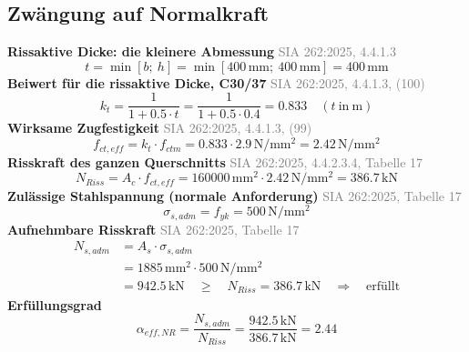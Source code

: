 \documentclass[11pt,a4paper]{article}
\newcommand{\normref}[1]{{\small\textcolor{gray}{#1}}}
\begin{document}
\subsection{Zwängung auf Normalkraft}
\noindent\textbf{Rissaktive Dicke: die kleinere Abmessung} \hfill \normref{SIA 262:2025, 4.4.1.3}
\begin{equation*}
t = \min\left[b;\ h\right] = \min\left[400\,\mathrm{mm};\ 400\,\mathrm{mm}\right] = 400\,\mathrm{mm}
\end{equation*}
\noindent\textbf{Beiwert für die rissaktive Dicke, C30/37} \hfill \normref{SIA 262:2025, 4.4.1.3, (100)}
\begin{equation*}
k_t = \frac{1}{1 + 0.5 \cdot t} = \frac{1}{1 + 0.5 \cdot 0.4} = 0.833 \quad \left(t\ \text{in}\ \mathrm{m}\right)
\end{equation*}
\noindent\textbf{Wirksame Zugfestigkeit} \hfill \normref{SIA 262:2025, 4.4.1.3, (99)}
\begin{equation*}
f_{ct,eff} = k_t \cdot f_{ctm} = 0.833 \cdot 2.9\,\mathrm{N}/\mathrm{mm}^{2} = 2.42\,\mathrm{N}/\mathrm{mm}^{2}
\end{equation*}
\noindent\textbf{Risskraft des ganzen Querschnitts} \hfill \normref{SIA 262:2025, 4.4.2.3.4, Tabelle 17}
\begin{equation*}
N_{Riss} = A_c \cdot f_{ct,eff} = 160000\,\mathrm{mm}^{2} \cdot 2.42\,\mathrm{N}/\mathrm{mm}^{2} = 386.7\,\mathrm{kN}
\end{equation*}
\noindent\textbf{Zulässige Stahlspannung (normale Anforderung)} \hfill \normref{SIA 262:2025, Tabelle 17}
\begin{equation*}
\sigma_{s,adm} = f_{yk} = 500\,\mathrm{N}/\mathrm{mm}^{2}
\end{equation*}
\noindent\textbf{Aufnehmbare Risskraft} \hfill \normref{SIA 262:2025, Tabelle 17}
\begin{equation*}
\begin{aligned}
  N_{s,adm} &= A_s \cdot \sigma_{s,adm} \\
  &= 1885\,\mathrm{mm}^{2} \cdot 500\,\mathrm{N}/\mathrm{mm}^{2} \\
  &= 942.5\,\mathrm{kN} \quad \ge \quad N_{Riss} = 386.7\,\mathrm{kN} \quad \Rightarrow \quad \text{erfüllt}
\end{aligned}
\end{equation*}
\noindent\textbf{Erfüllungsgrad}
\begin{equation*}
\alpha_{eff,NR} = \frac{N_{s,adm}}{N_{Riss}} = \frac{942.5\,\mathrm{kN}}{386.7\,\mathrm{kN}} = 2.44
\end{equation*}
\end{document}
